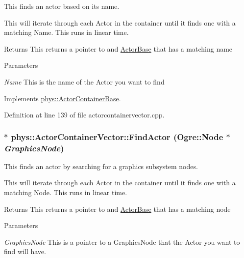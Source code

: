 This finds an actor based on its name. 

This will iterate through each Actor in the container until it finds one with a matching Name. This runs in linear time. \begin{DoxyReturn}{Returns}
This returns a pointer to and \hyperlink{classphys_1_1ActorBase}{ActorBase} that has a matching name 
\end{DoxyReturn}

\begin{DoxyParams}{Parameters}
\item[{\em Name}]This is the name of the Actor you want to find \end{DoxyParams}


Implements \hyperlink{classphys_1_1ActorContainerBase_a91223cbaebb8e5f11a4f971d7e5b64b6}{phys::ActorContainerBase}.



Definition at line 139 of file actorcontainervector.cpp.

\hypertarget{classphys_1_1ActorContainerVector_ad01cf1452bda36cee175ae0e54d509cc}{
\subsubsection[{FindActor}]{ $\ast$ phys::ActorContainerVector::FindActor (Ogre::Node $\ast$ {\em GraphicsNode})}}
\label{d3/d64/classphys_1_1ActorContainerVector_ad01cf1452bda36cee175ae0e54d509cc}


This finds an actor by searching for a graphics subsystem nodes. 

This will iterate through each Actor in the container until it finds one with a matching Node. This runs in linear time. \begin{DoxyReturn}{Returns}
This returns a pointer to and \hyperlink{classphys_1_1ActorBase}{ActorBase} that has a matching node 
\end{DoxyReturn}

\begin{DoxyParams}{Parameters}
\item[{\em GraphicsNode}]This is a pointer to a GraphicsNode that the Actor you want to find will have. \end{DoxyParams}


